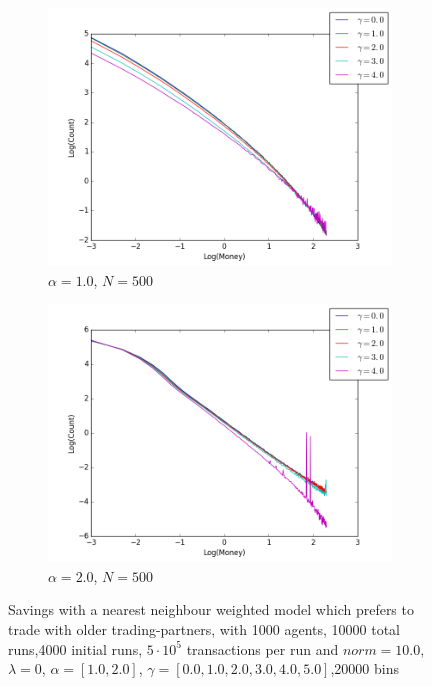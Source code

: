 \documentclass[a4paper,11pt]{article}
\begin{document}
{\begin{figure}[H]
	\centering
	\begin{subfigure}[t]{0.45\textwidth}
		\includegraphics[scale=0.4]{historic_lambda=0_0_alpha=1}
		\caption{$\alpha = 1.0$, $N=500$}
		\label{fig:historic_lambda=0_0_alpha=1}
	\end{subfigure}
	\begin{subfigure}[t]{0.45\textwidth}
		\includegraphics[scale=0.4]{historic_lambda=0_0_alpha=2}
		\caption{$\alpha = 2.0$, $N=500$}
		\label{fig:historic_lambda=0_0_alpha=2}
	\end{subfigure}
	\caption{Savings with a nearest neighbour weighted model which prefers to trade with older trading-partners, with 1000 agents, 10000 total runs,4000 initial runs,  $5\cdot 10^{5}$ transactions per run and  $norm=10.0$,$\lambda=0$, $\alpha=[1.0,2.0]$, $\gamma=[0.0,1.0,2.0,3.0,4.0,5.0]$,20000 bins}
	\label{fig:history_lambda=0_0}
\end{figure}


}
\end{document}
